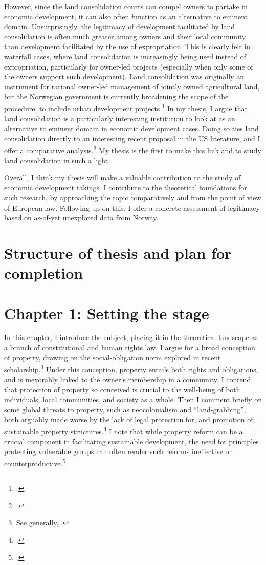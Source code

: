 \documentclass[12pt,a4paper]{article} %
\begin{document}
However, since the land consolidation courts can compel owners to partake in economic development, it can also often function as an alternative to eminent domain. Unsurprisingly, the legitimacy of development facilitated by land consolidation is often much greater among owners and their local community than development facilitated by the use of expropriation. This is clearly felt in waterfall cases, where land consolidation is increasingly being used instead of expropriation, particularly for owner-led projects (especially when only some of the owners support such development). Land consolidation was originally an instrument for rational owner-led management of jointly owned agricultural land, but the Norwegian government is currently broadening the scope of the procedure, to include urban development projects.\footcite[788-790]{stenseth10} In my thesis, I argue that land consolidation is a particularly interesting institution to look at as an alternative to eminent domain in economic development cases. Doing so ties land consolidation directly to an interesting recent proposal in the US literature, and I offer a comparative analysis.\footcite{heller08} My thesis is the first to make this link and to study land consolidation in such a light.

Overall, I think my thesis will make a valuable contribution to the study of economic development takings. I contribute to the theoretical foundations for such research, by approaching the topic comparatively and from the point of view of European law. Following up on this, I offer a concrete assessment of legitimacy based on as-of-yet unexplored data from Norway.

\section*{Structure of thesis and plan for completion}

\section*{Chapter 1: Setting the stage}\label{chap:1}

In this chapter, I introduce the subject, placing it in the theoretical landscape as a branch of constitutional and human rights law. 
I argue for a broad conception of property, drawing on the social-obligation norm explored in recent scholarship.\footnote{See generally, \cite{alexander06,dagan07,underkuffer07}.} Under this conception, property entails both rights and obligations, and is inexorably linked to the owner's  membership in a community. I contend that protection of property so conceived is crucial to the well-being of both individuals, local communities, and society as a whole. Then I comment briefly on some global threats to property, such as neocolonialism and ``land-grabbing'', both arguably made worse by the lack of legal protection for, and promotion of, sustainable property structures.\footcite{narula13} I note that while property reform can be a crucial component in facilitating sustainable development, the need for principles protecting vulnerable groups can often render such reforms ineffective or counterproductive.\footcite{smith03}
\end{document}
